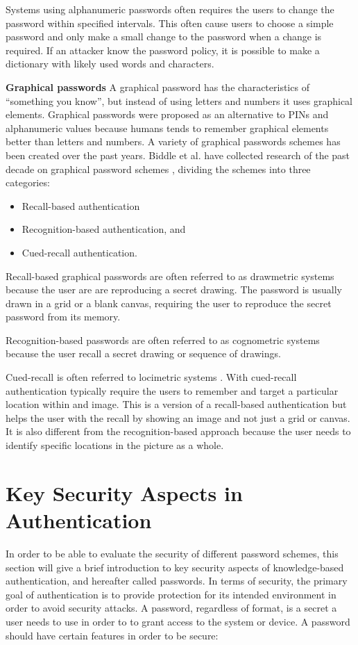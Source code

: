       Systems using alphanumeric passwords often requires the users to change the password within specified intervals. This often cause users to choose a simple password and only make a small change to the password when a change is required. If an attacker know the password policy, it is possible to make a dictionary with likely used words and characters. 

      {\bf Graphical passwords}
      A graphical password has the characteristics of ``something you know'', but instead of using letters and numbers it uses graphical elements. Graphical passwords were proposed as an alternative to PINs and alphanumeric values because humans tends to remember graphical elements better than letters and numbers. A variety of graphical passwords schemes has been created over the past years. Biddle et al. have collected research of the past decade on graphical password schemes \cite{Biddle}, dividing the schemes into three categories:

      \begin{itemize}
        \item Recall-based authentication
        \item Recognition-based authentication, and 
        \item Cued-recall authentication.
      \end{itemize}

    Recall-based graphical passwords are often referred to as drawmetric systems \cite{DeAngeli} because the user are are reproducing a secret drawing. The password is usually drawn in a grid or a blank canvas, requiring the user to reproduce the secret password from its memory.

    Recognition-based passwords are often referred to as cognometric systems \cite{DeAngeli} because the user recall a secret drawing or sequence of drawings.

    Cued-recall is often referred to locimetric systems \cite{DeAngeli}. With cued-recall authentication typically require the users to remember and target a particular location within and image. This is a version of a recall-based authentication but helps the user with the recall by showing an image and not just a grid or canvas. It is also different from the recognition-based approach because the user needs to identify specific locations in the picture as a whole. 
    
  \section{Key Security Aspects in Authentication} \label{sec:entropy}
  In order to be able to evaluate the security of different password schemes, this section will give a brief introduction to key security aspects of knowledge-based authentication, and hereafter called passwords. In terms of security, the primary goal of authentication is to provide protection for its intended environment in order to avoid security attacks. A password, regardless of format, is a secret a user needs to use in order to to grant access to the system or device. A password should have certain features in order to be secure:

